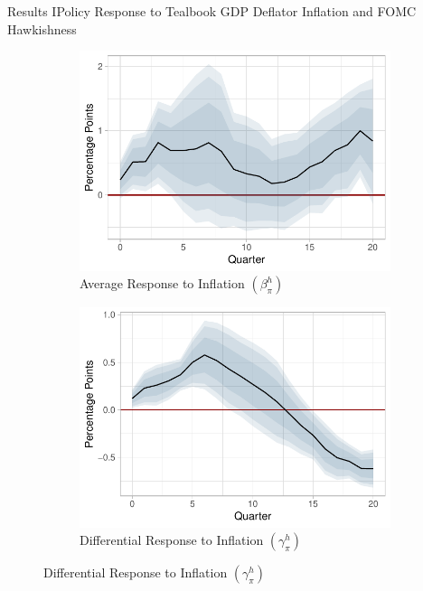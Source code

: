 \documentclass[11pt,pdf,aspectratio=129]{beamer}
\begin{document}
\begin{frame}{Results I}{Policy Response to Tealbook GDP Deflator Inflation and FOMC Hawkishness}

    \begin{figure}[!htbp]\centering
        \label{fig:LP}
        \begin{subfigure}[b]{0.48\textwidth}
            \centering
            \caption{Average Response to Inflation $\left(\beta_\pi^h\right)$}
            \label{fig:average_inflation}
            \includegraphics[width=\linewidth]{average_deflator_inflation_longer.pdf}
        \end{subfigure}
        \hfill
        \begin{subfigure}[b]{0.48\textwidth}
            \centering 
            \caption{Differential Response to Inflation $\left(\gamma_\pi^h\right)$}
            \label{fig:differential_inflation}
            \includegraphics[width=\linewidth]{differential_deflator_inflation_longer.pdf}

\end{subfigure}
\end{figure}
\end{frame}
\end{document}
